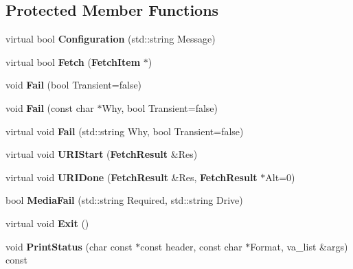 \subsection*{\-Protected \-Member \-Functions}
\begin{DoxyCompactItemize}
\item 
virtual bool {\bfseries \-Configuration} (std\-::string \-Message)\label{classpkgAcqMethod_a1350c1dbcd8ed165524e939b89b7ef13}

\item 
virtual bool {\bfseries \-Fetch} ({\bf \-Fetch\-Item} $\ast$)\label{classpkgAcqMethod_a34ca11f06af17cf5be9bbfec7b7f6fa4}

\item 
void {\bfseries \-Fail} (bool \-Transient=false)\label{classpkgAcqMethod_af3d113761395655d4a02778467a7b8bf}

\item 
void {\bfseries \-Fail} (const char $\ast$\-Why, bool \-Transient=false)\label{classpkgAcqMethod_a136331fb821e85ee40546a055c702632}

\item 
virtual void {\bfseries \-Fail} (std\-::string \-Why, bool \-Transient=false)\label{classpkgAcqMethod_a8ecaba4ad5e14aea51345cce43d971b2}

\item 
virtual void {\bfseries \-U\-R\-I\-Start} ({\bf \-Fetch\-Result} \&\-Res)\label{classpkgAcqMethod_a4985704ac80f24d42829166167f5d6ce}

\item 
virtual void {\bfseries \-U\-R\-I\-Done} ({\bf \-Fetch\-Result} \&\-Res, {\bf \-Fetch\-Result} $\ast$\-Alt=0)\label{classpkgAcqMethod_af4339b65bb7503be6a7da6659ce60de2}

\item 
bool {\bfseries \-Media\-Fail} (std\-::string \-Required, std\-::string \-Drive)\label{classpkgAcqMethod_aa21e332c8a680e471a4d65139b2daf3c}

\item 
virtual void {\bfseries \-Exit} ()\label{classpkgAcqMethod_a322d6a60f62afd58f32e4ffd7b40e6c6}

\item 
void {\bfseries \-Print\-Status} (char const $\ast$const header, const char $\ast$\-Format, va\-\_\-list \&args) const \label{classpkgAcqMethod_ab5553f75512040bb27b0df42eaf01d5e}

\end{DoxyCompactItemize}
